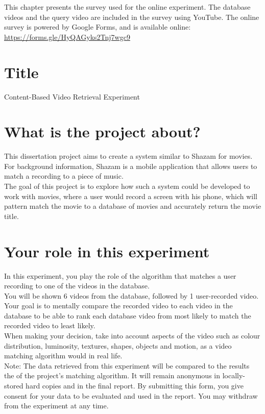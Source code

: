 This chapter presents the survey used for the online experiment. The database videos and the query video are included in the survey using YouTube. The online survey is powered by Google Forms, and is available online: \url{https://forms.gle/HyQAGyks2Tnj7wgc9}

\section{Title}

Content-Based Video Retrieval Experiment

\section{What is the project about?}

This dissertation project aims to create a system similar to Shazam for movies.\\

For background information, Shazam is a mobile application that allows users to match a recording to a piece of music.\\

The goal of this project is to explore how such a system could be developed to work with movies, where a user would record a screen with his phone, which will pattern match the movie to a database of movies and accurately return the movie title.

\section{Your role in this experiment}

In this experiment, you play the role of the algorithm that matches a user recording to one of the videos in the database.\\

You will be shown 6 videos from the database, followed by 1 user-recorded video.
Your goal is to mentally compare the recorded video to each video in the database to be able to rank each database video from most likely to match the recorded video to least likely.\\

When making your decision, take into account aspects of the video such as colour distribution, luminosity, textures, shapes, objects and motion, as a video matching algorithm would in real life.\\

Note: The data retrieved from this experiment will be compared to the results the of the project's matching algorithm. It will remain anonymous in locally-stored hard copies and in the final report. By submitting this form, you give consent for your data to be evaluated and used in the report. You may withdraw from the experiment at any time.

